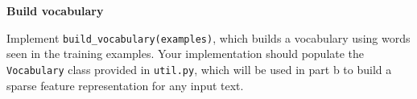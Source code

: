 \item {} \textbf{Build vocabulary}

Implement \texttt{build\_vocabulary(examples)}, which builds a vocabulary using
words seen in the training examples. Your implementation should populate the \texttt{Vocabulary} class provided in \texttt{util.py}, which will
be used in part b to build a sparse feature representation for any input text.

